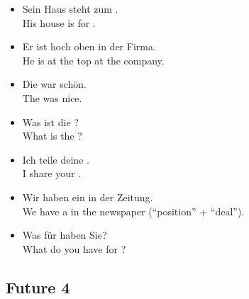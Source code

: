 \begin{itemize}
  \item  Sein Haus steht zum . \\
  His house is for .
  \item  Er ist hoch oben in der Firma. \\
  He is at the top at the company.
  \item  Die  war sch{\"o}n. \\
  The  was nice.
  \item  Was ist die ? \\
  What is the ?
  \item  Ich teile deine . \\
  I share your .
  \item  Wir haben ein  in der Zeitung. \\
  We have a  in the newspaper (``position'' + ``deal'').
  \item  Was f{\"u}r  haben Sie? \\
  What do you have for ?
\end{itemize}


\pagebreak
\subsection{Future 4}

